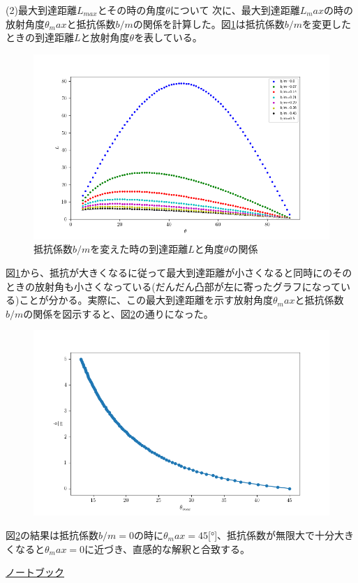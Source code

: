 \documentclass[a4j, dvipdfm]{jarticle}
\begin{document}
\begin{enumerate}[問題(1)]
        (2)最大到達距離$L_{max}$とその時の角度$\theta$について
        次に、最大到達距離$L_max$の時の放射角度$\theta_max$と抵抗係数$b/m$の関係を計算した。図\ref{change_bm}は抵抗係数$b/m$を変更したときの到達距離$L$と放射角度$\theta$を表している。
        \begin{figure}[H]
          \centering
          \includegraphics[width=12cm]{pic/change_bm.png}
          \caption{抵抗係数$b/m$を変えた時の到達距離$L$と角度$\theta$の関係}
          \label{change_bm}
        \end{figure}

        図\ref{change_bm}から、抵抗が大きくなるに従って最大到達距離が小さくなると同時にのそのときの放射角も小さくなっている(だんだん凸部が左に寄ったグラフになっている)ことが分かる。実際に、この最大到達距離を示す放射角度$\theta_max$と抵抗係数$b/m$の関係を図示すると、図\ref{theta_max}の通りになった。

        \begin{figure}[H]
          \centering
          \includegraphics[width=12cm]{pic/related_theta_bm.png}
          \caption{}
          \label{theta_max}
        \end{figure}
        図\ref{theta_max}の結果は抵抗係数$b/m=0$の時に$\theta_max=45$[°]、抵抗係数が無限大で十分大きくなると$\theta_max=0$に近づき、直感的な解釈と合致する。


        \begin{flushright}
          \href{https://github.com/eri61/computer_physics/blob/1336fc7c853c9eda9e7e32c47d7df82ef45bb469/report1/code/report01_05502231Matsuda.ipynb}{ノートブック}
        \end{flushright}
\end{enumerate}
\end{document}
